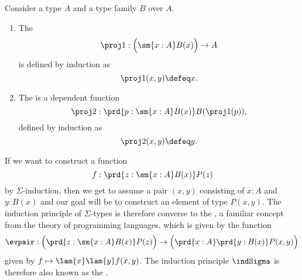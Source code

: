 \begin{defn}
  Consider a type $A$ and a type family $B$ over $A$.
  \begin{enumerate}
  \item The 
    \begin{equation*}
      \proj 1:\Big(\sm{x:A}B(x)\Big)\to A
    \end{equation*}
    is defined by induction as
    \begin{equation*}
      \proj 1(x,y) \defeq x.
    \end{equation*}
  \item The  is a dependent function
    \begin{equation*}
      \proj 2 : \prd{p:\sm{x:A}B(x)} B(\proj 1(p)),
    \end{equation*}
    defined by induction as
    \begin{equation*}
      \proj 2(x,y) \defeq y.
    \end{equation*}
  \end{enumerate}
\end{defn}

\begin{rmk}
  If we want to construct a function
  \begin{equation*}
    f:\prd{z:\sm{x:A}B(x)}P(z)
  \end{equation*}
  by $\Sigma$-induction, then we get to assume a pair $(x,y)$ consisting of $x:A$ and $y:B(x)$ and our goal will be to construct an element of type $P(x,y)$. The induction principle of $\Sigma$-types is therefore converse to the , a familiar concept from the theory of programming languages, which is given by the function
  \begin{equation*}
    \evpair : \Big(\prd{z:\sm{x:A}B(x)}P(z)\Big)\to \Big(\prd{x:A}\prd{y:B(x)}P(x,y)\Big)
  \end{equation*}
  given by $f\mapsto\lam{x}\lam{y}f(x,y)$. The induction principle $\indSigma$ is therefore also known as the . 
\end{rmk}


